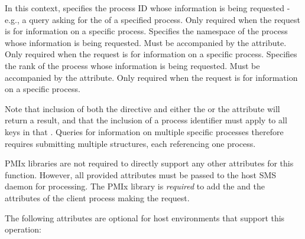 In this context, specifies the process ID whose information is being requested - e.g., a query asking for the  of a specified process. Only required when the request is for information on a specific process.
\pasteAttributeItemEnd
{}Specifies the namespace of the process whose information is being requested. Must be accompanied by the  attribute. Only required when the request is for information on a specific process.
\pasteAttributeItemEnd
{}Specifies the rank of the process whose information is being requested. Must be accompanied by the  attribute. Only required when the request is for information on a specific process.
\pasteAttributeItemEnd
{}

Note that inclusion of both the  directive and either the  or the  attribute will return a  result, and that the inclusion of a process identifier must apply to all keys in that . Queries for information on multiple specific processes therefore requires submitting multiple  structures, each referencing one process.

\ac{PMIx} libraries are not required to directly support any other attributes for this function. However, all provided attributes must be passed to the host \ac{SMS} daemon for processing. The \ac{PMIx} library is \textit{required} to add the  and the  attributes of the client process making the request.

\reqattrend


\optattrstart
The following attributes are optional for host environments that support this operation:

